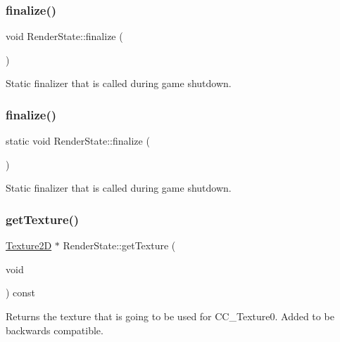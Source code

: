 \subsubsection{\texorpdfstring{finalize()}{finalize()}\hspace{0.1cm}{\footnotesize\ttfamily [1/2]}}
{\footnotesize\ttfamily void Render\+State\+::finalize (\begin{DoxyParamCaption}{ }\end{DoxyParamCaption})\hspace{0.3cm}{\ttfamily [static]}}

Static finalizer that is called during game shutdown. \mbox{\label{classRenderState_af0550c5aa93e0259c3adefe4c8184d01}} 
\subsubsection{\texorpdfstring{finalize()}{finalize()}\hspace{0.1cm}{\footnotesize\ttfamily [2/2]}}
{\footnotesize\ttfamily static void Render\+State\+::finalize (\begin{DoxyParamCaption}{ }\end{DoxyParamCaption})\hspace{0.3cm}{\ttfamily [static]}}

Static finalizer that is called during game shutdown. \mbox{\label{classRenderState_ad0b5d7ef008d158d45b2fec637d77e2b}} 
\subsubsection{\texorpdfstring{get\+Texture()}{getTexture()}\hspace{0.1cm}{\footnotesize\ttfamily [1/2]}}
{\footnotesize\ttfamily \hyperlink{classTexture2D}{Texture2D} $\ast$ Render\+State\+::get\+Texture (\begin{DoxyParamCaption}\item[{void}]{ }\end{DoxyParamCaption}) const}

Returns the texture that is going to be used for C\+C\+\_\+\+Texture0. Added to be backwards compatible. \mbox{\label{classRenderState_abca42dbf8d2b368e5fe8c04316feeff7}} 
